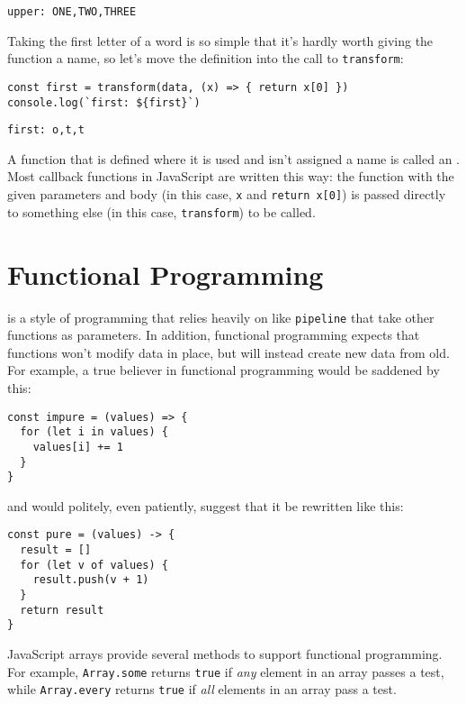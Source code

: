 \begin{verbatim}
upper: ONE,TWO,THREE
\end{verbatim}

Taking the first letter of a word is so simple that it's hardly worth giving the function a name,
so let's move the definition into the call to \texttt{transform}:

\begin{verbatim}
const first = transform(data, (x) => { return x[0] })
console.log(`first: ${first}`)
\end{verbatim}

\begin{verbatim}
first: o,t,t
\end{verbatim}

\noindent
A function that is defined where it is used and isn't assigned a name
is called an .
Most callback functions in JavaScript are written this way:
the function with the given parameters and body (in this case, \texttt{x} and \texttt{return x[0]})
is passed directly to something else (in this case, \texttt{transform}) to be called.

\section{Functional Programming}\label{s:callbacks-functional}

 is a style of programming
that relies heavily on  like \texttt{pipeline}
that take other functions as parameters.
In addition,
functional programming expects that functions won't modify data in place,
but will instead create new data from old.
For example,
a true believer in functional programming would be saddened by this:

\begin{verbatim}
const impure = (values) => {
  for (let i in values) {
    values[i] += 1
  }
}
\end{verbatim}

\noindent
and would politely, even patiently, suggest that it be rewritten like this:

\begin{verbatim}
const pure = (values) -> {
  result = []
  for (let v of values) {
    result.push(v + 1)
  }
  return result
}
\end{verbatim}

JavaScript arrays provide several methods to support functional programming.
For example,
\texttt{Array.some} returns \texttt{true} if \emph{any} element in an array passes a test,
while \texttt{Array.every} returns \texttt{true} if \emph{all} elements in an array pass a test.

